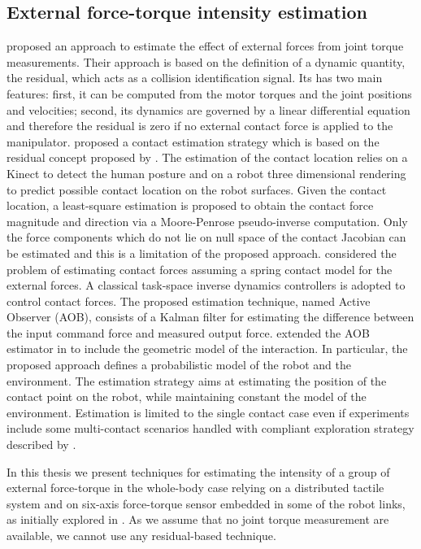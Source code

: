 \subsection{External force-torque intensity estimation}
\citep{DeLuca2006} proposed an approach to estimate the effect of external forces from joint torque measurements. Their approach is based on the definition of a dynamic quantity, the residual, which acts as a collision identification signal. Its has two main features: first, it can be computed from the motor torques and the joint positions and velocities; second, its dynamics are governed by a linear differential equation and therefore the residual is zero if no external contact force is applied to the manipulator. 
\citep{Magrini2014} proposed a contact estimation strategy which is based on the residual concept proposed by \citep{DeLuca2006}. The estimation of the contact location relies on a Kinect to detect the human posture and on a robot three dimensional rendering to predict possible contact location on the robot surfaces. Given the contact location, a least-square estimation is proposed to obtain the contact force magnitude and direction via a Moore-Penrose pseudo-inverse computation. Only the force components which do not lie on null space of the contact Jacobian can be estimated and this is a limitation of the proposed approach.
\citep{Park2005} considered the problem of estimating contact forces assuming a spring contact model for the external forces. A classical task-space inverse dynamics controllers is adopted to control contact forces. The proposed estimation technique, named Active Observer (AOB), consists of a Kalman filter for estimating the difference between the input command force and measured output force. \citep{Petrovskaya2007} extended the AOB estimator in \citep{Park2005} to include the geometric model of the interaction. In particular, the proposed approach defines a probabilistic model of the robot and the environment. The estimation strategy aims at estimating the position of the contact point on the robot, while maintaining constant the model of the environment. Estimation is limited to the single contact case even if experiments include some multi-contact scenarios handled with compliant exploration strategy described by \citep{Park2005}. 

In this thesis we present techniques for estimating the intensity of a group of external force-torque in the whole-body case relying on a distributed tactile system and on six-axis force-torque sensor embedded in some of the robot links, as initially explored in \citep{DelPrete2012}. As we assume that no joint torque measurement are available, we cannot use any residual-based technique.
 

